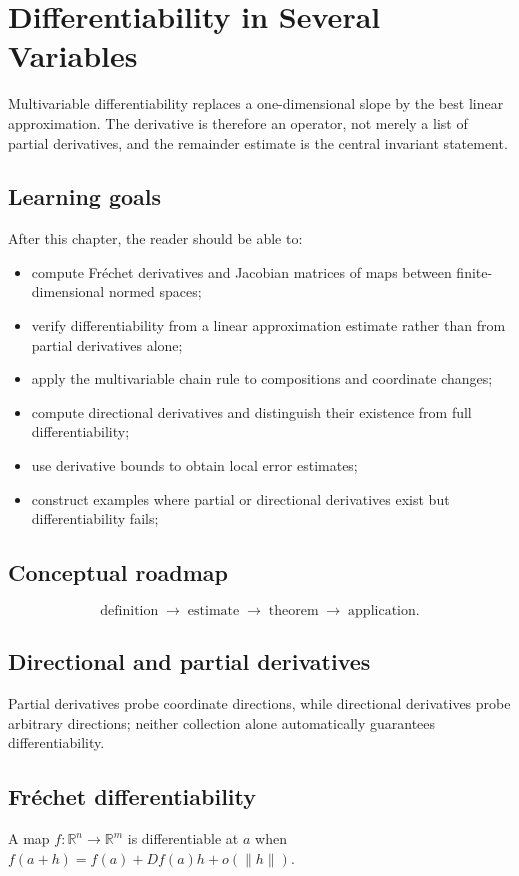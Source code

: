 \chapter{Differentiability in Several Variables}
\label{ch:ii08}

Multivariable differentiability replaces a one-dimensional slope by the best linear approximation. The derivative is therefore an operator, not merely a list of partial derivatives, and the remainder estimate is the central invariant statement.

\section*{Learning goals}
After this chapter, the reader should be able to:
\begin{itemize}
\item compute Fréchet derivatives and Jacobian matrices of maps between finite-dimensional normed spaces;
\item verify differentiability from a linear approximation estimate rather than from partial derivatives alone;
\item apply the multivariable chain rule to compositions and coordinate changes;
\item compute directional derivatives and distinguish their existence from full differentiability;
\item use derivative bounds to obtain local error estimates;
\item construct examples where partial or directional derivatives exist but differentiability fails;
\end{itemize}
\section*{Conceptual roadmap}
\[
\boxed{\text{definition}\;\longrightarrow\;\text{estimate}\;\longrightarrow\;\text{theorem}\;\longrightarrow\;\text{application}.}
\]

\section{Directional and partial derivatives}
Partial derivatives probe coordinate directions, while directional derivatives probe arbitrary directions; neither collection alone automatically guarantees differentiability.

\section{Fréchet differentiability}
A map $f:\mathbb R^n\to\mathbb R^m$ is differentiable at $a$ when $f(a+h)=f(a)+Df(a)h+o(\|h\|)$.


